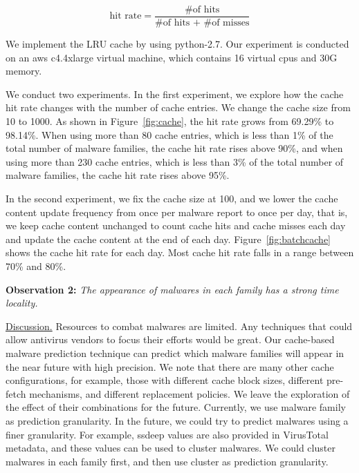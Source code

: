 $$ \mbox{hit rate} = \dfrac{\mbox{\# of hits}}{\mbox{\# of hits + \# of misses}}$$



We implement the LRU cache by using
python-2.7. Our experiment is conducted on an aws c4.4xlarge virtual machine, 
which contains 16 virtual cpus and 30G memory.

We conduct two experiments. In the first experiment, 
we explore how the cache hit rate changes with the number of cache entries. 
We change the cache size from 10 to 1000. As shown in Figure~\ref{fig:cache}, 
the hit rate grows from 69.29\% to 98.14\%. 
When using more than 80 cache entries, which is less than 1\% of the total number of malware families, the cache hit rate rises above 90\%, 
and when using more than 230 cache entries, which is less than 3\% of the total number of malware families, 
the cache hit rate rises above 95\%. 

In the second experiment, we fix the cache size at 100, 
and we lower the cache content update frequency from once per malware report to once per day, 
that is, we keep cache content unchanged to count cache hits and cache misses each day and update the cache content at the end of each day.
Figure~\ref{fig:batchcache} shows the cache hit rate for each day. 
Most cache hit rate falls in a range between 70\% and 80\%.  


{\bf Observation 2:} 
{\em The appearance of malwares in each family has a strong time locality.}  

\underline{Discussion.}
Resources to combat malwares are limited. 
Any techniques that could allow antivirus vendors to focus their efforts would be great. 
Our cache-based malware prediction technique can predict which malware families will appear in the near future with high precision. 
We note that there are many other cache configurations, for example, those
with different cache block sizes, different pre-fetch mechanisms, 
and different replacement policies. 
We leave the exploration of the effect of their combinations for the future. 
Currently, we use malware family as prediction granularity. 
In the future, we could try to predict malwares using a finer granularity. 
For example, ssdeep values are also provided in VirusTotal metadata, 
and these values can be used to cluster malwares. 
We could cluster malwares in each family first, and then use cluster as prediction granularity. 

